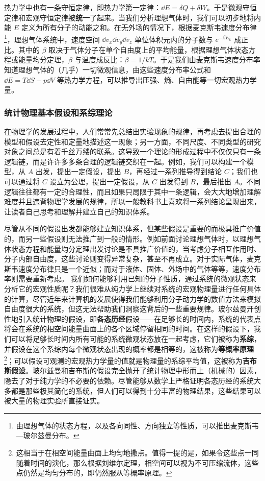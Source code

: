 热力学中也有一条守恒定律，即热力学第一定律：$\dd E=\delta Q+\delta W$。于是微观守恒定律和宏观守恒定律被\textbf{统一}了起来。当我们分析理想气体时，我们可以初步地将内能 $E$ 定义为所有分子的动能之和。在无外场的情况下，根据麦克斯韦速度分布律\footnote{由理想气体的状态方程，以及各向同性、方向独立等性质，可以推出麦克斯韦—玻尔兹曼分布。}，理想气体系统中，速度空间 $\dd v_x\dd v_y\dd v_z$ 单位体积元内的分子数与 $e^{-\beta E_k}$ 成正比。其中的 $\beta$ 取决于气体分子在单个自由度上的平均能量，根据理想气体状态方程或能量均分定理，$\beta$ 与温度成反比：$\beta=1/kT$。于是我们由麦克斯韦速度分布率知道理想气体的（几乎）一切微观信息，由这些速度分布率公式和 $\dd E=T\dd S-p\dd V$ 等热力学方程，可以推导出压强、熵、自由能等一切宏观热力学量。
\subsubsection{统计物理基本假设和系综理论}
在物理学的发展过程中，人们常常先总结出实验现象的规律，再考虑去提出合理的模型和假设去定性和定量地描述这一现象；另一方面，不同尺度、不同类型的研究对象之间总是有着千丝万缕的联系。这导致一个理论的形成过程中不仅仅只有一条逻辑链，而是许许多多条合理的逻辑链交织在一起。例如，我们可以构建一个模型，从 $A$ 出发，提出一定假设，提出 $B$，再经过一系列推导得到结论 $C$；我们也可以通过将 $C$ 设立为公理，提出一定假设，从 $C$ 出发得到 $B$，最后推出 $A$。不同逻辑往往都有一定的合理性，而且如果只局限于其中一条逻辑，会大大地增加理解难度并且违背物理学发展的规律，所以一般教科书上喜欢将一系列结论呈现出来，让读者自己思考和理解并建立自己的知识体系。

尽管从不同的假设出发都能够建立知识体系，但某些假设是重要的而极具推广价值的，而另一些假设则无法推广到一般的情形。例如前面讨论理想气体时，以理想气体状态方程和能量均分定理出发讨论是不具推广价值的，当考虑分子相互作用时、分子内部自由度，这些讨论则变得异常复杂，甚至不再成立。对于实际气体，麦克斯韦速度分布律只是一个近似；而对于液体、固体、外场中的气体等等，速度分布率则需要重新考虑。 我们如何能够利用已知的分子性质，通过系统的微观状态来分析它的宏观性质呢？我们很难从纯力学上继续对系统的宏观物理量进行任何具体的计算，尽管近年来计算机的发展使得我们能够利用分子动力学的数值方法来模拟自由度很大的系统，但这无法帮助我们洞察这背后的一些重要规律。玻尔兹曼开创性地引入统计物理的假设，即\textbf{各态历经}假设——在足够长的时间内，系统的代表点将会在系统的相空间能量曲面上的各个区域停留相同的时间。在这样的假设下，我们可以将足够长时间内所有可能的系统微观状态放在一起考虑，它们被称为\textbf{系综}，并假设在这个系综内每个微观状态出现的概率都是相等的，这被称为\textbf{等概率原理}\footnote{这相当于在相空间能量曲面上均匀地撒点。值得一提的是，如果令这些点一同随着时间的演化，那么根据刘维尔定理，相空间可以视为不可压缩流体，这些点仍然是均匀分布的，即仍然服从等概率原理。}；可以假设可观测的宏观热力学量的值就是物理量的系综平均值，这被称为\textbf{吉布斯假设}。玻尔兹曼和吉布斯的假设完全抛开了统计物理中形而上（机械的）因素，隐去了对于纯力学的不必要的依赖。尽管能够从数学上严格证明各态历经的系统大多都是那些极其简化的系统，但人们可以得到十分丰富的物理结果，这些结果可以被大量的物理实验所直接证实。

